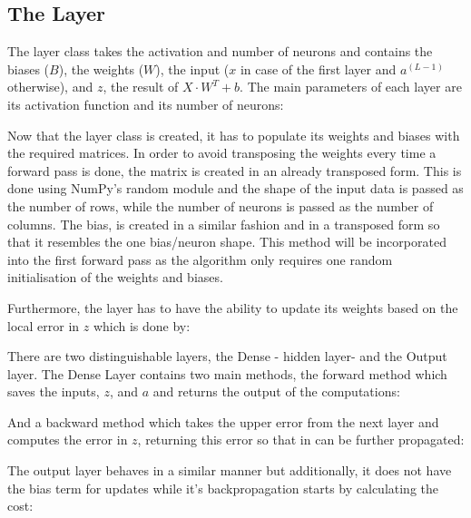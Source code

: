 \documentclass{report}
\begin{document}
\subsection{The Layer}

The layer class takes the activation and number of neurons and contains the biases ($B$), the weights ($W$),  the input ($x$ in case of the first layer and $a^{(L-1)}$ otherwise), and $z$, the result of $X\cdot W^{T} + b$.  The main parameters of each layer are its activation function and its number of neurons: 



Now that the layer class is created, it has to populate its weights and biases with the required matrices. In order to avoid transposing the weights every time a forward pass is done, the matrix is created in an already transposed form. This is done using NumPy's random module and the shape of the input data is passed as the number of rows, while the number of neurons is passed as the number of columns. The bias, is created in a similar fashion and in a transposed form so that it resembles the one bias/neuron shape. This method will be incorporated into the first forward pass as the algorithm only requires one random initialisation of the weights and biases.



Furthermore, the layer has to have the ability to update its weights based on the local error in $z$ which is done by:



There are two distinguishable layers, the Dense - hidden layer- and the Output layer. The Dense Layer contains two main methods, the forward method which saves the inputs, $z$, and $a$ and returns the output of the computations:



And a backward method which takes the upper error from the next layer and computes the error in $z$, returning this error so that in can be further propagated:



The output layer behaves in a similar manner but additionally, it does not have the bias term for updates while it's backpropagation starts by calculating the cost:
\end{document}
